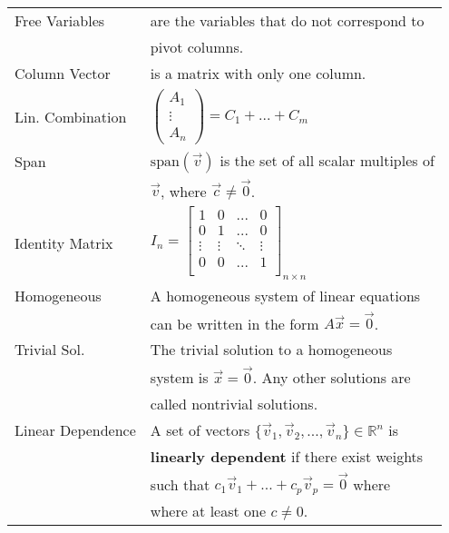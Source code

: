 \documentclass[5pt]{article}
\begin{document}
\begin{multicols}{2}
\begin{tabular}{ll}
    Free Variables          & are the variables that do not correspond to\\
                            & pivot columns.\\
    Column Vector           & is a matrix with only one column.\\
    Lin. Combination        & \footnotesize{$\begin{pmatrix}A_1\\ \vdots\\ A_n\end{pmatrix}=C_1 + ... + C_m$}\\
    Span                    & $\text{span}(\vec{v})$ is the set of all scalar multiples of\\
                            & $\vec{v}$, where $\vec{c}\neq\vec{0}$. \\
    Identity Matrix         & \footnotesize{$I_n=\begin{bmatrix}
                                  1 & 0 & ... & 0 \\
                                  0 & 1 & ... & 0 \\
                                  \vdots & \vdots & \ddots & \vdots \\
                                  0 & 0 & ... & 1 \\
                                \end{bmatrix}_{n\times n}$}\\
   Homogeneous              & A homogeneous system of linear equations\\
                            & can be written in the form $A\vec{x}=\vec{0}$.\\
   Trivial Sol.             & The trivial solution to a homogeneous\\
                            & system is $\vec{x}=\vec{0}$. Any other solutions are\\
                            & called nontrivial solutions.\\

\small{Linear Dependence}   & A set of vectors $\{\vec{v}_1, \vec{v}_2, ..., \vec{v}_n\}\in\mathbb{R}^n$ is\\
                            & \textbf{linearly dependent} if there exist weights\\
                            & such that $c_1\vec{v}_1 + ... + c_p\vec{v}_p=\vec{0}$ where\\
                            & where at least one $c\neq 0$.\\


\end{tabular}
\end{multicols}
\end{document}
